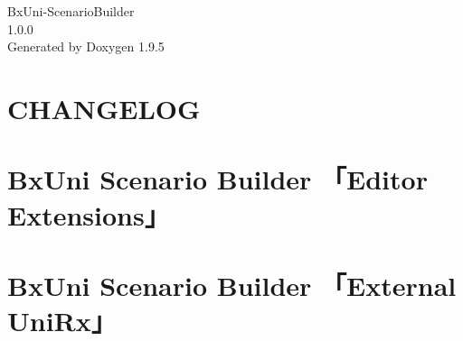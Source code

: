 \documentclass[twoside]{book}
\newcommand{\+}{\discretionary{\mbox{\scriptsize$\hookleftarrow$}}{}{}}
\newcommand{\clearemptydoublepage}{%
    \newpage{\pagestyle{empty}\cleardoublepage}%
  }
\begin{document}
  \raggedbottom
  \begin{CJK}{UTF8}{min}
    \hypersetup{pageanchor=false,
                bookmarksnumbered=true,
                pdfencoding=unicode
               }
  \begin{titlepage}
  \vspace*{7cm}
  \begin{center}%
  {\Large Bx\+Uni-\/\+Scenario\+Builder}\\
  [1ex]\large 1.\+0.\+0 \\
  \vspace*{1cm}
  {\large Generated by Doxygen 1.9.5}\\
  \end{center}
  \end{titlepage}
  \clearemptydoublepage
  \tableofcontents
  \clearemptydoublepage
  \hypersetup{pageanchor=true}
\chapter{CHANGELOG}
\label{md__c__home_murakami__b_x_tools__bx_uni__scenario_builder__packages__bx_uni__scenario_builder__c_h_a_n_g_e_l_o_g}

\chapter{Bx\+Uni Scenario Builder 「\+Editor Extensions」}
\label{md__c__home_murakami__b_x_tools__bx_uni__scenario_builder__packages__bx_uni__scenario_builder__documents___editor__extensions}

\chapter{Bx\+Uni Scenario Builder 「\+External Uni\+Rx」}
\label{md__c__home_murakami__b_x_tools__bx_uni__scenario_builder__packages__bx_uni__scenario_builder__documents___external__uni_rx}


\end{CJK}
\end{document}
